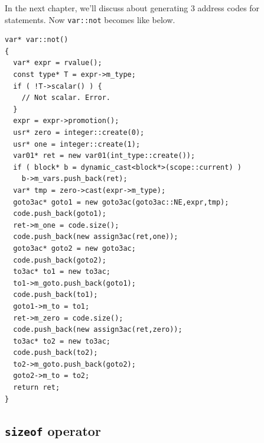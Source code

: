In the next chapter, we'll discuss about generating 3 address codes
for statements. Now {\tt{var::not}} becomes like below.
\begin{verbatim}
var* var::not()
{
  var* expr = rvalue();
  const type* T = expr->m_type;
  if ( !T->scalar() ) {
    // Not scalar. Error.
  }
  expr = expr->promotion();
  usr* zero = integer::create(0);
  usr* one = integer::create(1);
  var01* ret = new var01(int_type::create());
  if ( block* b = dynamic_cast<block*>(scope::current) )
    b->m_vars.push_back(ret);
  var* tmp = zero->cast(expr->m_type);
  goto3ac* goto1 = new goto3ac(goto3ac::NE,expr,tmp);
  code.push_back(goto1);
  ret->m_one = code.size();
  code.push_back(new assign3ac(ret,one));
  goto3ac* goto2 = new goto3ac;
  code.push_back(goto2);
  to3ac* to1 = new to3ac;
  to1->m_goto.push_back(goto1);
  code.push_back(to1);
  goto1->m_to = to1;
  ret->m_zero = code.size();
  code.push_back(new assign3ac(ret,zero));
  to3ac* to2 = new to3ac;
  code.push_back(to2);
  to2->m_goto.push_back(goto2);
  goto2->m_to = to2;
  return ret;
}
\end{verbatim}

\subsection{{\tt{sizeof}} operator}

